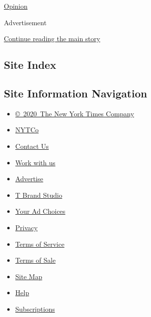 \href{/video/opinion}{Opinion}

Advertisement

\protect\hyperlink{after-bottom}{Continue reading the main story}

\hypertarget{site-index}{%
\subsection{Site Index}\label{site-index}}

\hypertarget{site-information-navigation}{%
\subsection{Site Information
Navigation}\label{site-information-navigation}}

\begin{itemize}
\tightlist
\item
  \href{https://help.nytimes3xbfgragh.onion/hc/en-us/articles/115014792127-Copyright-notice}{©~2020~The
  New York Times Company}
\end{itemize}

\begin{itemize}
\tightlist
\item
  \href{https://www.nytco.com/}{NYTCo}
\item
  \href{https://help.nytimes3xbfgragh.onion/hc/en-us/articles/115015385887-Contact-Us}{Contact
  Us}
\item
  \href{https://www.nytco.com/careers/}{Work with us}
\item
  \href{https://nytmediakit.com/}{Advertise}
\item
  \href{http://www.tbrandstudio.com/}{T Brand Studio}
\item
  \href{https://www.nytimes3xbfgragh.onion/privacy/cookie-policy\#how-do-i-manage-trackers}{Your
  Ad Choices}
\item
  \href{https://www.nytimes3xbfgragh.onion/privacy}{Privacy}
\item
  \href{https://help.nytimes3xbfgragh.onion/hc/en-us/articles/115014893428-Terms-of-service}{Terms
  of Service}
\item
  \href{https://help.nytimes3xbfgragh.onion/hc/en-us/articles/115014893968-Terms-of-sale}{Terms
  of Sale}
\item
  \href{https://spiderbites.nytimes3xbfgragh.onion}{Site Map}
\item
  \href{https://help.nytimes3xbfgragh.onion/hc/en-us}{Help}
\item
  \href{https://www.nytimes3xbfgragh.onion/subscription?campaignId=37WXW}{Subscriptions}
\end{itemize}
